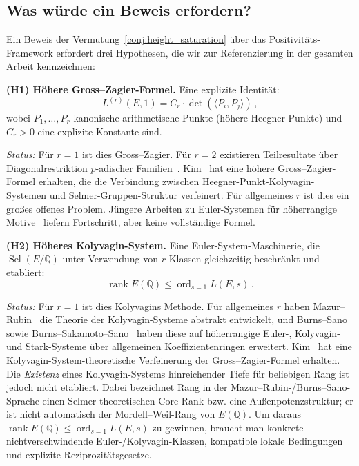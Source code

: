 \documentclass[aps,prd,twocolumn,superscriptaddress,nofootinbib,floatfix]{revtex4-2}
\theoremstyle{definition}
\theoremstyle{remark}
\DeclareMathOperator{\ord}{ord}
\DeclareMathOperator{\rank}{rank}
\DeclareMathOperator{\Sel}{Sel}
\begin{document}
\subsection{Was würde ein Beweis erfordern?}

Ein Beweis der Vermutung~\ref{conj:height_saturation} über das Positivitäts-Framework erfordert drei Hypothesen, die wir zur Referenzierung in der gesamten Arbeit kennzeichnen:

\textbf{(H1) Höhere Gross--Zagier-Formel.} Eine explizite Identität:
\begin{equation}
L^{(r)}(E,1) = C_r \cdot \det\!\left(\langle P_i, P_j \rangle\right)\,,
\label{eq:higher_gz}
\end{equation}
wobei $P_1, \ldots, P_r$ kanonische arithmetische Punkte (\glqq höhere Heegner-Punkte\grqq{}) und $C_r > 0$ eine explizite Konstante sind.

\textit{Status:} Für $r = 1$ ist dies Gross--Zagier. Für $r = 2$ existieren Teilresultate über Diagonalrestriktion $p$-adischer Familien~\cite{DarmonRotger2017}. Kim~\cite{Kim2024} hat eine höhere Gross--Zagier-Formel erhalten, die die Verbindung zwischen Heegner-Punkt-Kolyvagin-Systemen und Selmer-Gruppen-Struktur verfeinert. Für allgemeines $r$ ist dies ein großes offenes Problem. Jüngere Arbeiten zu Euler-Systemen für höherrangige Motive~\cite{LSZ2020} liefern Fortschritt, aber keine vollständige Formel.

\textbf{(H2) Höheres Kolyvagin-System.} Eine Euler-System-Maschinerie, die $\Sel(E/\mathbb{Q})$ unter Verwendung von $r$ Klassen gleichzeitig beschränkt und etabliert:
\begin{equation}
\rank E(\mathbb{Q}) \leq \ord_{s=1} L(E,s)\,.
\end{equation}

\textit{Status:} Für $r = 1$ ist dies Kolyvagins Methode. Für allgemeines $r$ haben Mazur--Rubin~\cite{MazurRubin2004} die Theorie der Kolyvagin-Systeme abstrakt entwickelt, und Burns--Sano~\cite{BurnsSano2021} sowie Burns--Sakamoto--Sano~\cite{BurnsSakamotoSano2025} haben diese auf höherrangige Euler-, Kolyvagin- und Stark-Systeme über allgemeinen Koeffizientenringen erweitert. Kim~\cite{Kim2024} hat eine Kolyvagin-System-theoretische Verfeinerung der Gross--Zagier-Formel erhalten. Die \textit{Existenz} eines Kolyvagin-Systems hinreichender Tiefe für beliebigen Rang ist jedoch nicht etabliert. Dabei bezeichnet \glqq Rang\grqq{} in der Mazur--Rubin-/Burns--Sano-Sprache einen Selmer-theoretischen Core-Rank bzw. eine Außenpotenzstruktur; er ist nicht automatisch der Mordell--Weil-Rang von $E(\mathbb{Q})$. Um daraus $\rank E(\mathbb{Q}) \leq \ord_{s=1}L(E,s)$ zu gewinnen, braucht man konkrete nichtverschwindende Euler-/Kolyvagin-Klassen, kompatible lokale Bedingungen und explizite Reziprozitätsgesetze.
\end{document}
